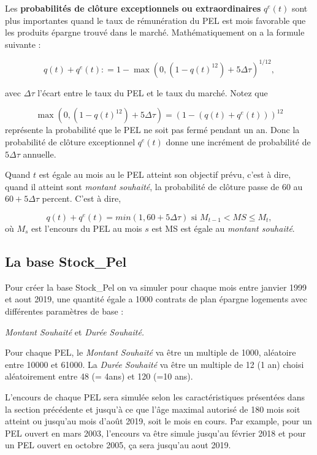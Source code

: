 \documentclass[12pt, a4paper]{book}
\begin{document}
Les {\bf probabilités de clôture exceptionnels ou extraordinaires} $q^e(t)$  sont plus importantes quand le taux de rémunération du PEL  est mois favorable que les produits épargne trouvé dans le marché. Mathématiquement on a la formule suivante  :

$$ q(t)+ q^e(t) : = 1 - \max(0, (1-q(t)^{12}) + 5\Delta \tau)^{1/12},$$

avec $\Delta \tau$ l'écart entre le taux du PEL et le taux du marché. Notez que 

$$ \max(0, (1-q(t)^{12}) + 5\Delta \tau)=(1-(q(t)+ q^e(t)))^{12} $$
représente la probabilité que le PEL ne soit pas fermé pendant un an. Donc la probabilité de clôture exceptionnel $q^e(t)$ donne une incrément de probabilité de $5\Delta \tau $ annuelle. 

Quand $t$ est égale au mois au le PEL atteint son objectif prévu, c'est à dire, quand il atteint sont {\it montant souhaité}, la probabilité de clôture passe de 60 au $60+ 5\Delta \tau$ percent. C'est à dire,

$$ q(t)+q^e(t) = min(1,60+5\Delta\tau) \mbox{ si }M_{t-1}< MS \leq M_t,$$
où $M_s$ est l'encours du PEL au mois $s$ est MS est égale au {\it montant souhaité}.

\subsection{La base Stock\_Pel}

Pour créer la base Stock\_Pel on va simuler pour chaque mois entre janvier 1999 et aout 2019, une quantité égale a 1000 contrats de plan épargne logements avec différentes paramètres de base :
\begin{center}
{\it Montant Souhaité} et {\it Durée Souhaité. }
\end{center}



Pour chaque PEL, le {\it Montant Souhaité} va être un multiple de 1000, aléatoire entre 10000 et 61000. La {\it Durée Souhaité} va être un multiple de 12 (1 an) choisi aléatoirement  entre 48 (= 4ans) et 120 (=10 ans).

L'encours de chaque PEL sera simulée selon les caractéristiques présentées dans la section précédente et jusqu'à ce que l'âge maximal autorisé de 180 mois soit atteint ou jusqu'au mois d'août 2019, soit le mois en cours. Par example, pour un PEL ouvert en mars 2003, l'encours va être simule jusqu'au février 2018 et pour un PEL ouvert en octobre 2005, ça sera jusqu'au aout 2019. 
\end{document}
